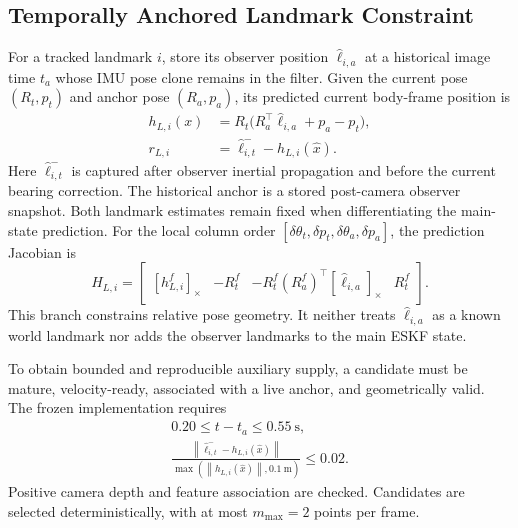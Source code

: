 \documentclass[a4paper,runningheads,twocolumn]{llncs}
\newcommand{\sk}[1]{[#1]_{\times}}
\newcommand{\norm}[1]{\left\lVert #1\right\rVert}
\begin{document}
\subsection{Temporally Anchored Landmark Constraint}
For a tracked landmark $i$, store its observer position $\hat\ell_{i,a}$ at a historical image time $t_a$ whose IMU pose clone remains in the filter. Given the current pose $(R_t,p_t)$ and anchor pose $(R_a,p_a)$, its predicted current body-frame position is
\begin{equation}
 \begin{aligned}
 h_{L,i}(x)&=R_t\big(R_a^\top\hat\ell_{i,a}+p_a-p_t\big),\\
 r_{L,i}&=\hat\ell_{i,t}^{-}-h_{L,i}(\hat x).
 \end{aligned}
 \label{eq:landmark}
\end{equation}
Here $\hat\ell_{i,t}^{-}$ is captured after observer inertial propagation and before the current bearing correction. The historical anchor is a stored post-camera observer snapshot. Both landmark estimates remain fixed when differentiating the main-state prediction. For the local column order $[\delta\theta_t,\delta p_t,\delta\theta_a,\delta p_a]$, the prediction Jacobian is
\begin{equation}
 H_{L,i}=
 \begin{bmatrix}
 \sk{h_{L,i}^f}&-R_t^f&
 -R_t^f(R_a^f)^\top\sk{\hat\ell_{i,a}}&R_t^f
 \end{bmatrix}.
 \label{eq:landmarkH}
\end{equation}
This branch constrains relative pose geometry. It neither treats $\hat\ell_{i,a}$ as a known world landmark nor adds the observer landmarks to the main ESKF state.

To obtain bounded and reproducible auxiliary supply, a candidate must be mature, velocity-ready, associated with a live anchor, and geometrically valid. The frozen implementation requires
\begin{equation}
 \begin{gathered}
 0.20\leq t-t_a\leq0.55~\mathrm{s},\\
 \frac{\norm{\hat\ell_{i,t}^{-}-h_{L,i}(\hat x)}}
 {\max(\norm{h_{L,i}(\hat x)},0.1~\mathrm{m})}\leq0.02 .
 \end{gathered}
 \label{eq:lvalid}
\end{equation}
Positive camera depth and feature association are checked. Candidates are selected deterministically, with at most $m_{\max}=2$ points per frame.
\end{document}
